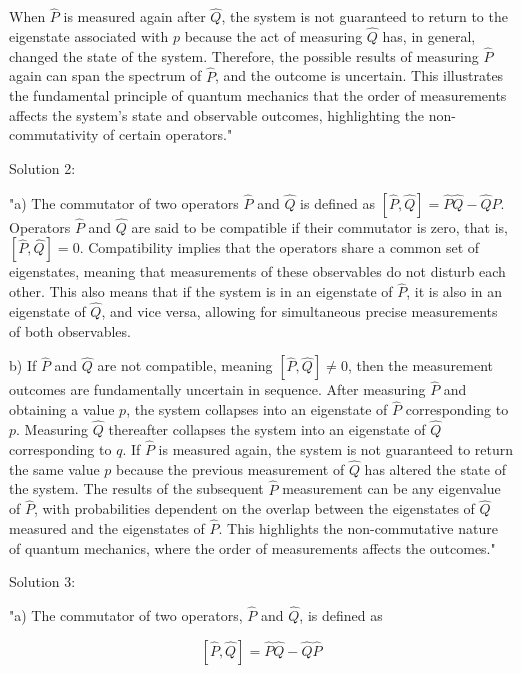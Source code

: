 When \( \hat{P} \) is measured again after \( \hat{Q} \), the system is not guaranteed to return to the eigenstate associated with \( p \) because the act of measuring \( \hat{Q} \) has, in general, changed the state of the system. Therefore, the possible results of measuring \( \hat{P} \) again can span the spectrum of \( \hat{P} \), and the outcome is uncertain. This illustrates the fundamental principle of quantum mechanics that the order of measurements affects the system's state and observable outcomes, highlighting the non-commutativity of certain operators."

Solution 2: 

"a) The commutator of two operators \( \hat{P} \) and \( \hat{Q} \) is defined as \([ \hat{P}, \hat{Q} ] = \hat{P}\hat{Q} - \hat{Q}\hat{P}\). Operators \( \hat{P} \) and \( \hat{Q} \) are said to be compatible if their commutator is zero, that is, \([ \hat{P}, \hat{Q} ] = 0\). Compatibility implies that the operators share a common set of eigenstates, meaning that measurements of these observables do not disturb each other. This also means that if the system is in an eigenstate of \( \hat{P} \), it is also in an eigenstate of \( \hat{Q} \), and vice versa, allowing for simultaneous precise measurements of both observables.

b) If \( \hat{P} \) and \( \hat{Q} \) are not compatible, meaning \([ \hat{P}, \hat{Q} ] \neq 0\), then the measurement outcomes are fundamentally uncertain in sequence. After measuring \( \hat{P} \) and obtaining a value \( p \), the system collapses into an eigenstate of \( \hat{P} \) corresponding to \( p \). Measuring \( \hat{Q} \) thereafter collapses the system into an eigenstate of \( \hat{Q} \) corresponding to \( q \). If \( \hat{P} \) is measured again, the system is not guaranteed to return the same value \( p \) because the previous measurement of \( \hat{Q} \) has altered the state of the system. The results of the subsequent \( \hat{P} \) measurement can be any eigenvalue of \( \hat{P} \), with probabilities dependent on the overlap between the eigenstates of \( \hat{Q} \) measured and the eigenstates of \( \hat{P} \). This highlights the non-commutative nature of quantum mechanics, where the order of measurements affects the outcomes."

Solution 3:

"a) The commutator of two operators, \( \hat{P} \) and \( \hat{Q} \), is defined as

\[ [\hat{P}, \hat{Q}] = \hat{P}\hat{Q} - \hat{Q}\hat{P} \]

